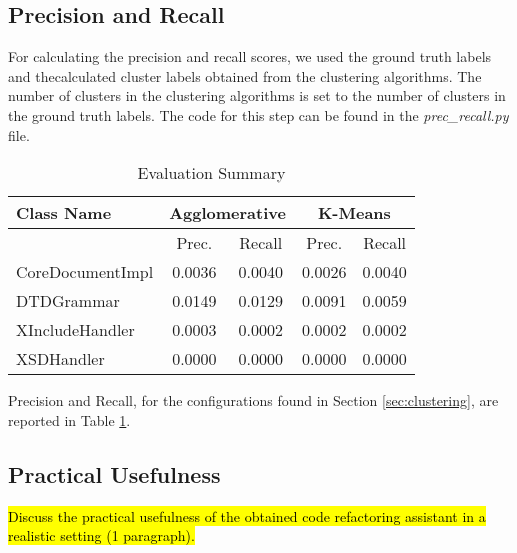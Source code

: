 \documentclass{article}
\newcommand\templateInstruction[1]{
\hl{#1}
}
\begin{document}
\subsection{Precision and Recall}
For calculating the precision and recall scores, we used the ground truth labels and thecalculated cluster labels obtained from the clustering algorithms. The number of clusters in the clustering algorithms is set to the number of clusters in the ground truth labels. The code for this step can be found in the \textit{prec\_recall.py} file.
\begin{table}[]
    \centering
    \begin{tabular}{lcccc}
        \hline
        \textbf{Class Name} &\multicolumn{2}{c}{\textbf{Agglomerative}} & \multicolumn{2}{c}{\textbf{K-Means}} \\
        \hline
         &Prec. & Recall & Prec. & Recall \\
        \hline\hline
        {CoreDocumentImpl} & {0.0036} & {0.0040}& {0.0026}& {0.0040}\\
       {DTDGrammar} & {0.0149} & {0.0129}& {0.0091}& {0.0059}\\
        {XIncludeHandler} & {0.0003} & {0.0002}& {0.0002}& {0.0002}\\
        {XSDHandler} & {0.0000} & {0.0000}& {0.0000}& {0.0000}\\
        \hline
    \end{tabular}
    \caption{Evaluation Summary}
    \label{tab:eval}
\end{table}

Precision and Recall, for the configurations found in Section \ref{sec:clustering}, are reported in Table \ref{tab:eval}.


\subsection{Practical Usefulness}
\templateInstruction{Discuss the practical usefulness of the obtained code refactoring assistant in a realistic setting (1 paragraph).}
\end{document}
